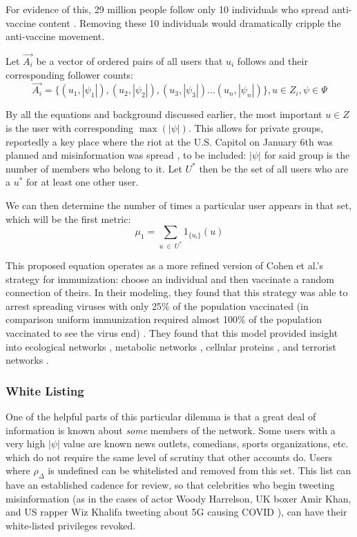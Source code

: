 \documentclass[preprint,review,12pt]{elsarticle}
\begin{document}
For evidence of this, 29 million people follow only 10 individuals who spread anti-vaccine content \cite{npr2021teachers,ahmed2020antivaxx}. Removing these 10 individuals would dramatically cripple the anti-vaccine movement.

Let $\vec{A_i}$ be a vector of ordered pairs of all users that $u_i$ follows and their corresponding follower counts:
\begin{equation} 
\label{row of adjacency matrix}
\vec{A_i}=\{(u_1,|\psi_1|),(u_2,|\psi_2|),(u_3,|\psi_3|)\dots (u_n,|\psi_n|)\}, u \in Z_i, \psi \in \Psi
\end{equation}

By all the equations and background discussed earlier, the most important $u \in Z$ is the user with corresponding $\max(|\psi|)$. This allows for private groups, reportedly a key place where the riot at the U.S. Capitol on January 6th was planned and misinformation was spread \cite{yin2021facebook,horwitz2020facebook}, to be included: $|\psi|$ for said group is the number of members who belong to it. 
Let $U^*$ then be the set of all users who are a $u^*$ for at least one other user.

We can then determine the number of times a particular user appears in that set, which will be the first metric: 
\begin{equation}
\label{mu_1 equation}
    \mu_1 = \sum_{u\ \in \ U^*}1_{\{u_i\}}(u)
\end{equation}

This proposed equation operates as a more refined version of Cohen et al.'s strategy for immunization: choose an individual and then vaccinate a random connection of theirs. In their modeling, they found that this strategy was able to arrest spreading viruses with only 25\% of the population vaccinated (in comparison uniform immunization required almost 100\% of the population vaccinated to see the virus end) \cite{cohen2003efficient}. They found that this model provided insight into ecological networks \cite{sole2001complexity,camacho2002robust}, metabolic networks \cite{jeong2000large}, cellular proteins \cite{jeong2001lethality}, and terrorist networks \cite{cohen2003efficient}. 

\subsubsection{White Listing}
\label{sec: white listing}
One of the helpful parts of this particular dilemma is that a great deal of information is known about \textit{some} members of the network. Some users with a very high $|\psi|$ value are known news outlets, comedians, sports organizations, etc. which do not require the same level of scrutiny that other accounts do. Users where $\rho_{\Delta}$ is undefined can be whitelisted and removed from this set. This list can have an established cadence for review, so that celebrities who begin tweeting misinformation (as in the cases of actor Woody Harrelson, UK boxer Amir Khan, and US rapper Wiz Khalifa tweeting about 5G causing COVID \cite{bruns2020covid19}), can have their white-listed privileges revoked. 
\end{document}
